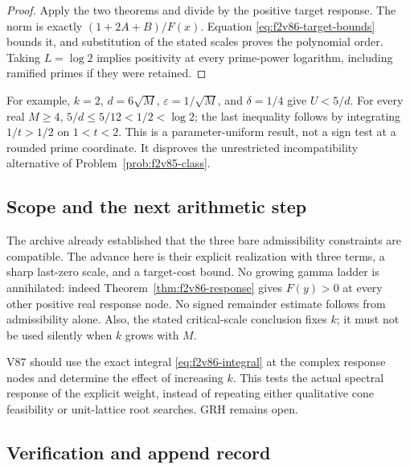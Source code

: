 \documentclass[11pt]{article}
\theoremstyle{definition}
\theoremstyle{remark}
\begin{document}
\begin{proof}
Apply the two theorems and divide by the positive target response.
The norm is exactly \((1+2A+B)/F(x)\).  Equation
\eqref{eq:f2v86-target-bounds} bounds it, and substitution of the stated
scales proves the polynomial order.  Taking \(L=\log2\) implies
positivity at every prime-power logarithm, including ramified primes if
they were retained.
\end{proof}

For example, \(k=2\), \(d=6\sqrt M\), \(\varepsilon=1/\sqrt M\),
and \(\delta=1/4\) give \(U<5/d\).  For every real \(M\ge4\),
\(5/d\le5/12<1/2<\log2\); the last inequality follows by integrating
\(1/t>1/2\) on \(1<t<2\).  This is a parameter-uniform result, not
a sign test at a rounded prime coordinate.  It disproves the unrestricted
incompatibility alternative of Problem~\ref{prob:f2v85-class}.

\subsection{Scope and the next arithmetic step}

The archive already established that the three bare admissibility
constraints are compatible.  The advance here is their explicit
realization with three terms, a sharp last-zero scale, and a target-cost
bound.  No growing gamma ladder is annihilated: indeed
Theorem~\ref{thm:f2v86-response} gives \(F(y)>0\) at every other
positive real response node.  No signed remainder estimate follows from
admissibility alone.  Also, the stated critical-scale conclusion fixes
\(k\); it must not be used silently when \(k\) grows with \(M\).

V87 should use the exact integral \eqref{eq:f2v86-integral} at the
complex response nodes and determine the effect of increasing \(k\).
This tests the actual spectral response of the explicit weight, instead
of repeating either qualitative cone feasibility or unit-lattice root
searches.  GRH remains open.

\subsection*{Verification and append record}
\end{document}
